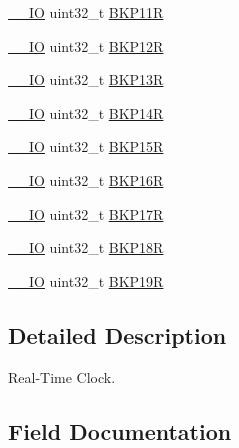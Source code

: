 \begin{DoxyCompactItemize}
\item 
\mbox{\hyperlink{core__sc300_8h_aec43007d9998a0a0e01faede4133d6be}{\+\_\+\+\_\+\+IO}} uint32\+\_\+t \mbox{\hyperlink{struct_r_t_c___type_def_ac66d5e2d3459cff89794c47dbc8f7228}{B\+K\+P11R}}
\item 
\mbox{\hyperlink{core__sc300_8h_aec43007d9998a0a0e01faede4133d6be}{\+\_\+\+\_\+\+IO}} uint32\+\_\+t \mbox{\hyperlink{struct_r_t_c___type_def_a6f7eee5ae8a32c07f9c8fe14281bdaf3}{B\+K\+P12R}}
\item 
\mbox{\hyperlink{core__sc300_8h_aec43007d9998a0a0e01faede4133d6be}{\+\_\+\+\_\+\+IO}} uint32\+\_\+t \mbox{\hyperlink{struct_r_t_c___type_def_a6ed4c3a0d4588a75078e9f8e376b4d06}{B\+K\+P13R}}
\item 
\mbox{\hyperlink{core__sc300_8h_aec43007d9998a0a0e01faede4133d6be}{\+\_\+\+\_\+\+IO}} uint32\+\_\+t \mbox{\hyperlink{struct_r_t_c___type_def_ac60f13e6619724747e61cfbff55b9fab}{B\+K\+P14R}}
\item 
\mbox{\hyperlink{core__sc300_8h_aec43007d9998a0a0e01faede4133d6be}{\+\_\+\+\_\+\+IO}} uint32\+\_\+t \mbox{\hyperlink{struct_r_t_c___type_def_afafaddc3a983eb71332b7526d82191ad}{B\+K\+P15R}}
\item 
\mbox{\hyperlink{core__sc300_8h_aec43007d9998a0a0e01faede4133d6be}{\+\_\+\+\_\+\+IO}} uint32\+\_\+t \mbox{\hyperlink{struct_r_t_c___type_def_ad2f2eb2fb4b93e21515b10e920e719b6}{B\+K\+P16R}}
\item 
\mbox{\hyperlink{core__sc300_8h_aec43007d9998a0a0e01faede4133d6be}{\+\_\+\+\_\+\+IO}} uint32\+\_\+t \mbox{\hyperlink{struct_r_t_c___type_def_a2842aa523df62f3508316eb3b2e08f4e}{B\+K\+P17R}}
\item 
\mbox{\hyperlink{core__sc300_8h_aec43007d9998a0a0e01faede4133d6be}{\+\_\+\+\_\+\+IO}} uint32\+\_\+t \mbox{\hyperlink{struct_r_t_c___type_def_a640ccb2ccfb6316b88c070362dc29339}{B\+K\+P18R}}
\item 
\mbox{\hyperlink{core__sc300_8h_aec43007d9998a0a0e01faede4133d6be}{\+\_\+\+\_\+\+IO}} uint32\+\_\+t \mbox{\hyperlink{struct_r_t_c___type_def_a4ec1dd54d976989b7c9e59fb14d974fb}{B\+K\+P19R}}
\end{DoxyCompactItemize}


\subsection{Detailed Description}
Real-\/\+Time Clock. 

\subsection{Field Documentation}
\mbox{\label{struct_r_t_c___type_def_ac005b1a5bc52634d5a34578cc9d2c3f6}} 
